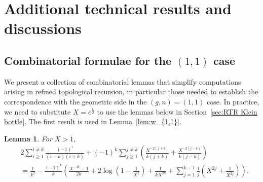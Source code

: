 \documentclass[12pt]{amsart}
\theoremstyle{plain}
\newtheorem{lemma}[theorem]{Lemma}
\theoremstyle{definition}
\theoremstyle{remark}
\numberwithin{equation}{section}
\begin{document}
\appendix

\section{Additional technical results and discussions}


\subsection{Combinatorial formulae for the $(1,1)$ case}\label{sec:formulae}

We present a collection of combinatorial lemmas that simplify computations arising in refined topological recursion, in particular those needed to establish the correspondence with the geometric side in the $(g,n)=(1,1)$ case. In practice, we need to substitute $X = e^{\frac{\epsilon}{2}}$ to use the lemmas below in Section~\ref{sec:RTR Klein bottle}.
The first result is used in Lemma~\ref{lem:w_{1,1}}.
\begin{lemma}\label{lem:combinatorics0}
For $X>1$,
\begin{align*} 
    &2\sum_{i\geq1}^{i\neq k}\frac{(-1)^i}{(i-k)(i+k)}
+(-1)^k\sum_{j\geq1}^{j\neq k}\left(\frac{X^{-2(j+k)}}{k(j+k)}+\frac{X^{-2(j-k)}}{k(j-k)}\right)\nonumber\\
    &=\frac{1}{k^2}-\frac{(-1)^k}{k}\left(\frac{X^{-4k}-1}{2k}+2\log\left(1-\frac{1}{X^{2}}\right)+\frac{1}{kX^{2k}}+\sum_{j=1}^{k-1}\frac{1}{j}\left(X^{2j}+\frac{1}{X^{2j}}\right)\right).
\end{align*}
\end{lemma}
\end{document}
